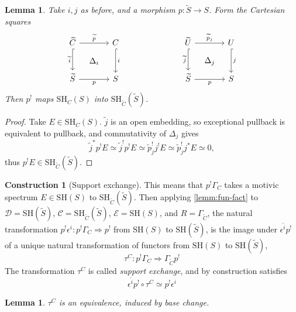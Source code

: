 \documentclass[11pt, twoside]{article}
\numberwithin{equation}{section}
\newtheorem{lemma}[equation]{Lemma}
\theoremstyle{definition}
\newtheorem{construction}[equation]{Construction}
\newcommand{\sh}{\mathrm{SH}}
\begin{document}
\begin{lemma}
Take \(i, j\) as before, and a morphism \(p \colon \tilde{S} \to S\). Form the Cartesian squares
\begin{equation}\label{eq:pullbacks}
\begin{tikzcd} [row sep = large, column sep = large] \tilde{C} \ar[d, hookrightarrow, swap, "\tilde{i}"] \ar[r, "\tilde{p}", ""{name=h1}] & C \ar[d, hookrightarrow, "i"]
& & \tilde{U} \ar[d, hookrightarrow, swap, "\tilde{j}"] \ar[r, "\tilde{p}_j", ""{name=h3}] & U \ar[d, hookrightarrow, "j"]\\
\tilde{S} \ar[r, swap, "p", ""{name=h2}] & S & & \tilde{S} \ar[r, swap, "p", ""{name=h4}] & S
\ar[phantom, from=h1, to=h2, "\Delta_i"] \ar[phantom, from=h3, to=h4, "\Delta_j"] \end{tikzcd}
\end{equation}
Then \(p^!\) maps \(\sh_{C}(S)\) into \(\sh_{\tilde{C}}(\tilde{S})\).
\end{lemma}

\begin{proof}
Take \(E \in \sh_C(S)\). \(\tilde{j}\) is an open embedding, so exceptional pullback is equivalent to pullback, and commutativity of \(\Delta_j\) gives  
\[\tilde{j}^*p^!E \simeq \tilde{j}^! p^!E \simeq \tilde{p}_j^!j^!E \simeq \tilde{p}_j^! j^*E \simeq 0,\]
thus \(p^!E \in \sh_{\tilde{C}}(\tilde{S})\).
\end{proof}

\begin{construction}[Support exchange]\label{con:ex-supp}
This means that \(p^! \Gamma_C\) takes a motivic spectrum \(E \in \sh(S)\) to \(\sh_{\tilde{C}}(\tilde{S})\). Then applying \ref{lemm:fun-fact} to \(\mathcal{D} = \sh(\tilde{S})\), \(\mathcal{C} = \sh_{\tilde{C}}(\tilde{S})\), \(\mathcal{E} = \sh(S)\), and \(R = \Gamma_{\tilde{C}}\), the natural transformation \(p^!\epsilon^i \colon p^! \Gamma_C \Longrightarrow p^!\) from \(\sh(S)\) to \(\sh(\tilde{S})\), is the image under \(\epsilon^{\tilde{i}}p^!\) of a unique natural transformation of functors from \(\sh(S)\) to \(\sh(\tilde{S})\),
\[\tau^C \colon p^!\Gamma_C \Longrightarrow \Gamma_{\tilde{C}}p^!\]
The transformation \(\tau^C\) is called \emph{support exchange}, and by construction satisfies
\begin{equation}\label{eq:tau-epsilon}
\epsilon^{\tilde{i}}p^! \circ \tau^C \simeq p^! \epsilon^i
\end{equation}
\end{construction}

\begin{lemma}
\(\tau^C\) is an equivalence, induced by base change.
\end{lemma}
\end{document}
